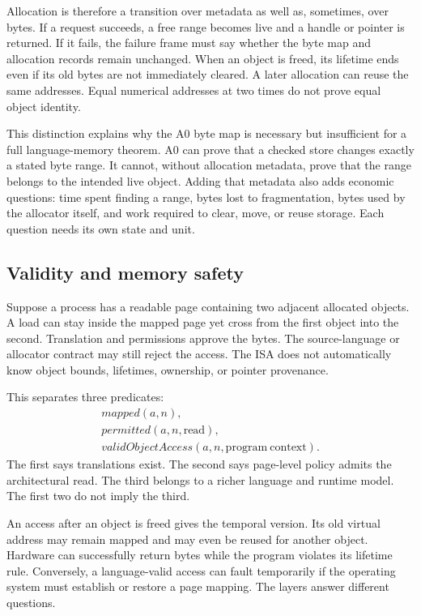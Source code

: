Allocation is therefore a transition over metadata as well as, sometimes,
over bytes. If a request succeeds, a free range becomes live and a handle or
pointer is returned. If it fails, the failure frame must say whether the byte
map and allocation records remain unchanged. When an object is freed, its
lifetime ends even if its old bytes are not immediately cleared. A later
allocation can reuse the same addresses. Equal numerical addresses at two
times do not prove equal object identity.

This distinction explains why the A0 byte map is necessary but insufficient
for a full language-memory theorem. A0 can prove that a checked store changes
exactly a stated byte range. It cannot, without allocation metadata, prove
that the range belongs to the intended live object. Adding that metadata also
adds economic questions: time spent finding a range, bytes lost to
fragmentation, bytes used by the allocator itself, and work required to
clear, move, or reuse storage. Each question needs its own state and unit.

\subsection{Validity and memory safety}

Suppose a process has a readable page containing two adjacent allocated
objects. A load can stay inside the mapped page yet cross from the first object
into the second. Translation and permissions approve the bytes. The
source-language or allocator contract may still reject the access. The ISA
does not automatically know object bounds, lifetimes, ownership, or pointer
provenance.

This separates three predicates:
\[
 \begin{array}{l}
 \mathit{mapped}(a,n),\\
 \mathit{permitted}(a,n,\mathrm{read}),\\
 \mathit{validObjectAccess}(a,n,\mathrm{program\ context}).
 \end{array}
\]
The first says translations exist. The second says page-level policy admits
the architectural read. The third belongs to a richer language and runtime
model. The first two do not imply the third.

An access after an object is freed gives the temporal version. Its old virtual
address may remain mapped and may even be reused for another object. Hardware
can successfully return bytes while the program violates its lifetime rule.
Conversely, a language-valid access can fault temporarily if the operating
system must establish or restore a page mapping. The layers answer different
questions.

